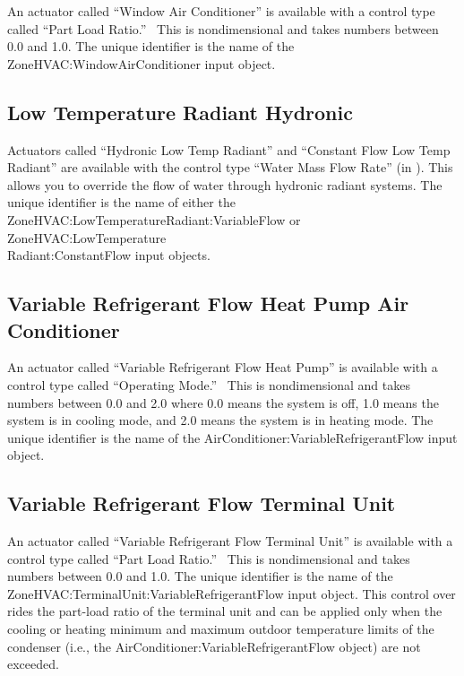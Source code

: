 An actuator called ``Window Air Conditioner'' is available with a control type called ``Part Load Ratio.''~ This is nondimensional and takes numbers between 0.0 and 1.0. The unique identifier is the name of the ZoneHVAC:WindowAirConditioner input object.

\subsection{Low Temperature Radiant Hydronic}\label{low-temperature-radiant-hydronic}

Actuators called ``Hydronic Low Temp Radiant'' and ``Constant Flow Low Temp Radiant'' are available with the control type ``Water Mass Flow Rate'' (in \si{\massFlowRate}). This allows you to override the flow of water through hydronic radiant systems. The unique identifier is the name of either the ZoneHVAC:LowTemperatureRadiant:VariableFlow or ZoneHVAC:LowTemperature\\
Radiant:ConstantFlow input objects.

\subsection{Variable Refrigerant Flow Heat Pump Air Conditioner}\label{variable-refrigerant-flow-heat-pump-air-conditioner}

An actuator called ``Variable Refrigerant Flow Heat Pump'' is available with a control type called ``Operating Mode.''~ This is nondimensional and takes numbers between 0.0 and 2.0 where 0.0 means the system is off, 1.0 means the system is in cooling mode, and 2.0 means the system is in heating mode. The unique identifier is the name of the AirConditioner:VariableRefrigerantFlow input object.

\subsection{Variable Refrigerant Flow Terminal Unit}\label{variable-refrigerant-flow-terminal-unit}

An actuator called ``Variable Refrigerant Flow Terminal Unit'' is available with a control type called ``Part Load Ratio.''~ This is nondimensional and takes numbers between 0.0 and 1.0. The unique identifier is the name of the ZoneHVAC:TerminalUnit:VariableRefrigerantFlow input object. This control over rides the part-load ratio of the terminal unit and can be applied only when the cooling or heating minimum and maximum outdoor temperature limits of the condenser (i.e., the AirConditioner:VariableRefrigerantFlow object) are not exceeded.

